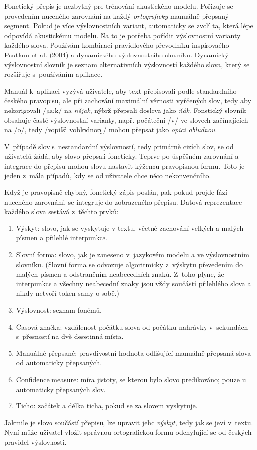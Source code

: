 Fonetický přepis je nezbytný pro trénování akustického modelu. Pořizuje se
provedením nuceného zarovnání na každý {\em ortograficky} manuálně přepsaný segment. Pokud je více
výslovnostních variant, automaticky se zvolí ta, která lépe odpovídá akustickému
modelu. Na to je potřeba pořídit výslovnostní varianty každého slova. Používám
kombinaci pravidlového převodníku inspirovaého Psutkou et
al. (2004)\cite{psutka2004development} a dynamického výslovnostního slovníku. Dynamický
výslovnostní slovník je seznam alternativních výslovností každého slova, který
se rozšiřuje s~používáním aplikace.

Manuál k~aplikaci vyzývá uživatele, aby text přepisovali podle standardního
českého pravopisu, ale při zachování maximální věrnosti vyřčených slov, tedy aby
nekorigovali  /ɲaːk/ \normalfont na {\em nějak}, nýbrž
přepsali doslova jako {\em ňák}. Fonetický slovník obsahuje časté výslovnostní
varianty, např. počáteční  /v/ \normalfont ve slovech
začínajících na  /o/\normalfont, tedy 
/vopit͡si  voblʊdnoʊ̯ /   \normalfont mohou přepsat jako {\em opici obludnou}.

V~případě slov s~nestandardní výslovností, tedy primárně cizích slov, se od
uživatelů žádá, aby slovo přepsali foneticky. Teprve po úspěšném zarovnání a
integrace do přepisu mohou slovu nastavit kýženou pravopisnou formu. Toto je
jeden z~mála případů, kdy se od uživatele chce něco nekonvenčního.

Když je pravopisně chybný, fonetický zápis poslán, pak pokud projde fází
nuceného zarovnání, se integruje do zobrazeného přepisu. Datová reprezentace
každého slova sestává z~těchto prvků:
\begin{enumerate}
\item{Výskyt:
    slovo, jak se vyskytuje v textu, včetně zachování velkých a malých písmen a
    přilehlé interpunkce.
}
\item{Slovní forma:
    slovo, jak je zaneseno v~jazykovém modelu a ve výslovnostním slovníku.
    (Slovní forma se odvozuje algoritmicky z~výskytu převedením do malých písmen
    a odstraněním neabecedních znaků. Z~toho plyne, že interpunkce a všechny
    neabecední znaky jsou vždy součástí přilehlého slova a nikdy netvoří token
    samy o sobě.)
}
\item{Výslovnost:
    seznam fonémů.
}
\item{Časová značka:
    vzdálenost počátku slova od počátku nahrávky v~sekundách s~přesností na dvě
    desetinná místa.
}
\item{Manuálně přepsané:
    pravdivostní hodnota odlišující manuálně přepsaná slova od automaticky
    přepsaných.
}
\item{Confidence measure:
    míra jistoty, se kterou bylo slovo predikováno; pouze u automaticky
    přepsaných slov.
}
\item{Ticho:
    začátek a délka ticha, pokud se za slovem vyskytuje.
}
\end{enumerate}
Jakmile je slovo součástí přepisu, lze upravit jeho {\em výskyt}, tedy jak se
jeví v~textu. Nyní může uživatel vložit správnou ortografickou formu odchylující
se od českých pravidel výslovnosti.

